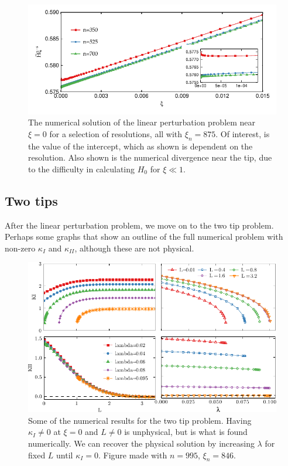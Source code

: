 \documentclass{jfm}
\begin{document}
\begin{figure}
 \centerline{
\includegraphics{./../../Graphs/linear-perturbation-plot.pdf}}
  \caption{The numerical solution of the linear perturbation problem near 
           $\xi=0$ for a selection of resolutions, all with $\xi_n = 875$. Of 
           interest, is the value of the intercept, which as shown is dependent
           on the resolution. Also shown is the numerical divergence near the 
           tip, due to the difficulty in calculating $H_0$ for $\xi \ll 1$.}
\end{figure}

\subsection{Two tips}
After the linear perturbation problem, we move on to the two tip
problem. Perhaps some graphs that show an outline of the full numerical problem
with non-zero $\kappa_I$ and $\kappa_{II}$, although these are not physical.
\begin{figure}
 \centerline{
\includegraphics{./../../Graphs/KI-KII-edited.pdf}}
  \caption{Some of the numerical results for the two tip problem. Having 
           $\kappa_{I} \neq 0$ at $\xi =0$ and $L \neq 0$ is unphysical, but
           is what is found numerically. We can recover the physical solution
           by increasing $\lambda$ for fixed $L$ until $\kappa_I =0$. Figure 
           made with $n = 995$, $\xi_n = 846$.}
\end{figure}
\end{document}
